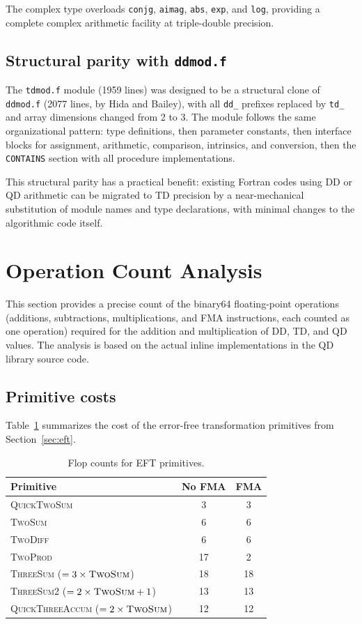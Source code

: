 \documentclass[11pt,a4paper]{article}
\begin{document}
The complex type overloads \texttt{conjg}, \texttt{aimag},
\texttt{abs}, \texttt{exp}, and \texttt{log}, providing a
complete complex arithmetic facility at triple-double precision.

\subsection{Structural parity with \texttt{ddmod.f}}

The \texttt{tdmod.f} module (1959 lines) was designed to be a
structural clone of \texttt{ddmod.f} (2077 lines, by Hida and
Bailey), with all \texttt{dd\_} prefixes replaced by \texttt{td\_}
and array dimensions changed from 2 to 3.  The module follows the
same organizational pattern: type definitions, then parameter
constants, then interface blocks for assignment, arithmetic,
comparison, intrinsics, and conversion, then the \texttt{CONTAINS}
section with all procedure implementations.

This structural parity has a practical benefit: existing Fortran
codes using DD or QD arithmetic can be migrated to TD precision
by a near-mechanical substitution of module names and type
declarations, with minimal changes to the algorithmic code itself.


\section{Operation Count Analysis}
\label{sec:flops}

This section provides a precise count of the binary64
floating-point operations (additions, subtractions,
multiplications, and FMA instructions, each counted as one
operation) required for the addition and multiplication of DD, TD,
and QD values.  The analysis is based on the actual inline
implementations in the QD library source code.

\subsection{Primitive costs}

Table~\ref{tab:primitives} summarizes the cost of the error-free
transformation primitives from Section~\ref{sec:eft}.

\begin{table}[h]
\centering
\caption{Flop counts for EFT primitives.}
\label{tab:primitives}
\begin{tabular}{lcc}
\toprule
Primitive & No FMA & FMA \\
\midrule
\textsc{QuickTwoSum} & 3 & 3 \\
\textsc{TwoSum} & 6 & 6 \\
\textsc{TwoDiff} & 6 & 6 \\
\textsc{TwoProd} & 17 & 2 \\
\textsc{ThreeSum} ($= 3 \times \textsc{TwoSum}$) & 18 & 18 \\
\textsc{ThreeSum2} ($= 2 \times \textsc{TwoSum} + 1$) & 13 & 13 \\
\textsc{QuickThreeAccum} ($= 2 \times \textsc{TwoSum}$) & 12 & 12 \\
\bottomrule
\end{tabular}
\end{table}
\end{document}
